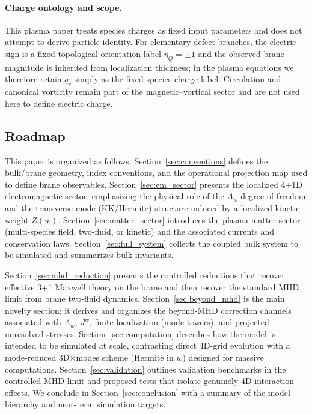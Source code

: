 \documentclass[11pt]{article}
\begin{document}
\paragraph{Charge ontology and scope.}
This plasma paper treats species charges as fixed input parameters and does not attempt to derive particle identity. For elementary defect branches, the electric sign is a fixed topological orientation label \(\eta_Q=\pm 1\) and the observed brane magnitude is inherited from localization thickness; in the plasma equations we therefore retain \(q_s\) simply as the fixed species charge label. Circulation and canonical vorticity remain part of the magnetic--vortical sector and are not used here to define electric charge.

\subsection{Roadmap}
This paper is organized as follows. Section~\ref{sec:conventions} defines the bulk/brane geometry, index conventions, and the operational projection map used to define brane observables. Section~\ref{sec:em_sector} presents the localized 4+1D electromagnetic sector, emphasizing the physical role of the \(A_w\) degree of freedom and the transverse-mode (KK/Hermite) structure induced by a localized kinetic weight \(Z(w)\). Section~\ref{sec:matter_sector} introduces the plasma matter sector (multi-species field, two-fluid, or kinetic) and the associated currents and conservation laws. Section~\ref{sec:full_system} collects the coupled bulk system to be simulated and summarizes bulk invariants.

Section~\ref{sec:mhd_reduction} presents the controlled reductions that recover effective 3+1 Maxwell theory on the brane and then recover the standard MHD limit from brane two-fluid dynamics. Section~\ref{sec:beyond_mhd} is the main novelty section: it derives and organizes the beyond-MHD correction channels associated with \(A_w\), \(J^w\), finite localization (mode towers), and projected unresolved stresses. Section~\ref{sec:computation} describes how the model is intended to be simulated at scale, contrasting direct 4D-grid evolution with a mode-reduced 3D\(\times\)modes scheme (Hermite in \(w\)) designed for massive computations. Section~\ref{sec:validation} outlines validation benchmarks in the controlled MHD limit and proposed tests that isolate genuinely 4D interaction effects. We conclude in Section~\ref{sec:conclusion} with a summary of the model hierarchy and near-term simulation targets.
\end{document}
